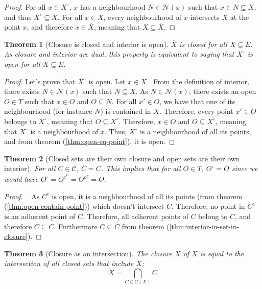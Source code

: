 \documentclass{article}
\newtheorem{theorem}{Theorem}[section]
\theoremstyle{definition}
\theoremstyle{remark}
\theoremstyle{example}
\theoremstyle{notation}
\newcommand{\inter}[1]{{{#1}^\circ}}
\newcommand{\adher}[1]{{\overline{#1}}}
\newcommand{\closed}{\mathcal{C}}
\begin{document}
\begin{proof}
		For all $x \in \inter{X}$, $x$ has a neighbourhood $N \in \mathcal{N}(x)$ such that $x \in N \subseteq X$, and thus $\inter{X} \subseteq X$. For all $x \in X$, every neighbourhood of $x$ intersects $X$ at the point $x$, and therefore $x \in \adher{X}$, meaning that $X \subseteq \adher{X}$.
\end{proof}

\begin{theorem}[Closure is closed and interior is open] \label{thm:closure-closed-interior-open}
		$\adher{X}$ is closed for all $X \subseteq E$. As closure and interior are dual, this property is equivalent to saying that $\inter{X}$ is open for all $X \subseteq E$.
\end{theorem}

\begin{proof}
		Let's prove that $\inter{X}$ is open. Let $x \in \inter{X}$. From the definition of interior, there exists $N \in \mathcal{N}(x)$ such that $N \subseteq X$. As $N \in \mathcal{N}(x)$, there exists an open $O \in T$ such that $x \in O$ and $O \subseteq N$. For all $x' \in O$, we have that one of its neighbourhood (for instance $N$) is contained in $X$. Therefore, every point $x' \in O$ belongs to $\inter{X}$, meaning that $O \subseteq \inter{X}$. Therefore, $x \in O$ and $O \subseteq \inter{X}$, meaning that $\inter{X}$ is a neighbourhood of $x$. Thus, $\inter{X}$ is a neighbourhood of all its points, and from theorem (\ref{thm:open-eq-point}), it is open.
\end{proof}

\begin{theorem}[Closed sets are their own closure and open sets are their own interior]
		For all $C \in \closed$, $\adher{C} = C$. This implies that for all $O \in T$, $\inter{O} = O$ since we would have $\inter{O} = \adher{O^c}^c = {O^c}^c = O$.
\end{theorem}

\begin{proof}~
		As $C^c$ is open, it is a neighbourhood of all its points (from theorem (\ref{thm:open-contain-point})) which doesn't intersect $C$. Therefore, no point in $C^c$ is an adherent point of $C$. Therefore, all adherent points of $C$ belong to $C$, and therefore $\adher{C} \subseteq C$. Furthermore $C \subseteq \adher{C}$ from theorem (\ref{thm:interior-in-set-in-closure}).
\end{proof}

\begin{theorem}[Closure as an intersection]
		The closure $\adher{X}$ of $X$ is equal to the intersection of all closed sets that include $X$:
				$$\adher{X} = \bigcap_{C \in \closed(X)} C$$
\end{theorem}
\end{document}
